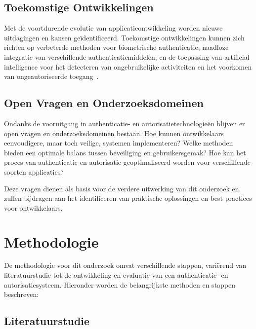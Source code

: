 \subsection{Toekomstige Ontwikkelingen}

Met de voortdurende evolutie van applicatieontwikkeling worden nieuwe uitdagingen en kansen geïdentificeerd. Toekomstige ontwikkelingen kunnen zich
richten op verbeterde methoden voor biometrische authenticatie, naadloze integratie van verschillende authenticatiemiddelen, en de toepassing van
artificial intelligence voor het detecteren van ongebruikelijke activiteiten en het voorkomen van ongeautoriseerde toegang~\autocite{Annadurai2022}.

\subsection{Open Vragen en Onderzoeksdomeinen}

Ondanks de vooruitgang in authenticatie- en autorisatietechnologieën blijven er open vragen en onderzoeksdomeinen bestaan. Hoe kunnen ontwikkelaars
eenvoudigere, maar toch veilige, systemen implementeren? Welke methoden bieden een optimale balans tussen beveiliging en gebruikersgemak? Hoe kan
het proces van authenticatie en autorisatie geoptimaliseerd worden voor verschillende soorten applicaties?

Deze vragen dienen als basis voor de verdere uitwerking van dit onderzoek en zullen bijdragen aan het identificeren van praktische oplossingen en
best practices voor ontwikkelaars.

\section{Methodologie}%
\label{sec:methodologie}

De methodologie voor dit onderzoek omvat verschillende stappen, variërend van literatuurstudie tot de ontwikkeling en evaluatie van een 
authenticatie- en autorisatiesysteem. Hieronder worden de belangrijkste methoden en stappen beschreven:

\subsection{Literatuurstudie}


